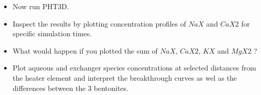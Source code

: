 \begin{itemize}
\item Now run PHT3D.

\item Inspect the results by plotting concentration profiles of $NaX$ and $CaX2$ for 
specific simulation times. 

\item What would happen if you plotted the sum of $NaX$, $CaX2$, $KX$ and $MgX2$ ?

\item Plot aqueous and exchanger species concentrations at selected distances from the heater element and interpret the breakthrough curves as wel as the differences between the 3 bentonites.   

\end{itemize}	







